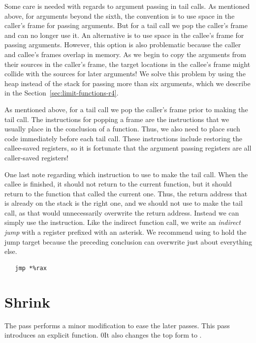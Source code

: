 \documentclass[7x10]{TimesAPriori_MIT}%
\def\racketEd{0}
\def\edition{1}
\newcommand{\racket}[1]{{\if\edition\racketEd{#1}\fi}}
\begin{document}
Some care is needed with regards to argument passing in tail calls.
As mentioned above, for arguments beyond the sixth, the convention is
to use space in the caller's frame for passing arguments.  But for a
tail call we pop the caller's frame and can no longer use it.  An
alternative is to use space in the callee's frame for passing
arguments. However, this option is also problematic because the caller
and callee's frames overlap in memory.  As we begin to copy the
arguments from their sources in the caller's frame, the target
locations in the callee's frame might collide with the sources for
later arguments! We solve this problem by using the heap instead of
the stack for passing more than six arguments, which we describe in
the Section~\ref{sec:limit-functions-r4}.

As mentioned above, for a tail call we pop the caller's frame prior to
making the tail call. The instructions for popping a frame are the
instructions that we usually place in the conclusion of a
function. Thus, we also need to place such code immediately before
each tail call. These instructions include restoring the callee-saved
registers, so it is fortunate that the argument passing registers are
all caller-saved registers!

One last note regarding which instruction to use to make the tail
call. When the callee is finished, it should not return to the current
function, but it should return to the function that called the current
one. Thus, the return address that is already on the stack is the
right one, and we should not use  to make the tail call, as
that would unnecessarily overwrite the return address. Instead we can
simply use the  instruction. Like the indirect function call,
we write an \emph{indirect jump} with a
register prefixed with an asterisk.  We recommend using  to
hold the jump target because the preceding conclusion can overwrite
just about everything else.
\begin{lstlisting}
   jmp *%rax
\end{lstlisting}


\section{Shrink \LangFun{}}
\label{sec:shrink-r4}

The  pass performs a minor modification to ease the
later passes. This pass introduces an explicit  function.
%
\racket{It also changes the top  form to
\code{ProgramDefs}.}
\end{document}
